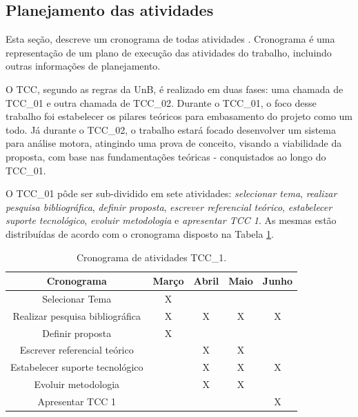 \subsection{Planejamento das atividades}
\label{Sec:Planejamento}
  Esta seção, descreve um cronograma de todas atividades
. Cronograma  é uma representação de um plano de
execução das atividades do trabalho, incluindo  outras
informações de planejamento.

O TCC, segundo as regras da UnB, é realizado em duas fases: uma chamada de TCC\_01 e outra chamada de TCC\_02.
 Durante o TCC\_01, o foco desse trabalho foi estabelecer os pilares teóricos para embasamento do projeto como um todo.
 Já durante o TCC\_02, o trabalho estará focado desenvolver um sistema para análise motora, atingindo uma prova de conceito,
  visando a viabilidade da proposta, com base nas fundamentações teóricas - conquistados ao longo do TCC\_01.

O TCC\_01 pôde ser sub-dividido em sete atividades: \textit{selecionar tema}, \textit{realizar pesquisa bibliográfica},
 \textit{definir proposta}, \textit{escrever referencial teórico}, \textit{estabelecer suporte tecnológico},
  \textit{evoluir metodologia} e \textit{apresentar TCC 1}.
  As mesmas estão distribuídas de acordo com o cronograma disposto na Tabela \ref{tab:cronograma1}.

\begin{table}[H]
	\centering
	\caption{Cronograma de atividades TCC\_1.}
	\label{tab:cronograma1}
	\begin{tabular}{@{}ccccc@{}}
		\toprule
		\textbf{Cronograma}             & \textbf{Março} & \textbf{Abril} & \textbf{Maio} & \textbf{Junho} \\ \midrule
		Selecionar Tema                 & X              &                &               &                \\ \midrule
		Realizar pesquisa bibliográfica & X              & X              & X             & X              \\ \midrule
		Definir proposta                & X              &                &               &                \\ \midrule
		Escrever referencial teórico    &                & X              & X             &                \\ \midrule
		Estabelecer suporte tecnológico &                & X              & X             & X              \\ \midrule
		Evoluir metodologia             &                & X              & X             &                \\ \midrule
		Apresentar TCC 1                &                &                &               & X              \\ \bottomrule
	\end{tabular}
\end{table}


